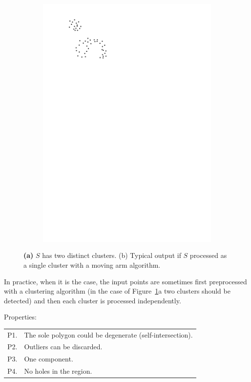 \begin{figure}
\begin{subfigure}[b]{0.35\linewidth}
    \centering
    \includegraphics[page=2,width=\textwidth]{figs/clusters.pdf}
    \caption{}
  \end{subfigure}
\caption{\textbf{(a)} $S$ has two distinct clusters. {(b)} Typical output if $S$ processed as a single cluster with a moving arm algorithm.}
\label{fig:clusters}
\end{figure}
In practice, when it is the case, the input points are sometimes first preprocessed with a clustering algorithm (in the case of Figure~\ref{fig:clusters}a two clusters should be detected) and then each cluster is processed independently.

%

Properties:
\\
\begin{tabular}{@{}ll@{}}
\toprule
P1. & The sole polygon could be degenerate (self-intersection).  \\  
P2. & Outliers can be discarded. \\ 
P3. & One component.  \\ 
P4. & No holes in the region.  \\  
\bottomrule
\end{tabular}



